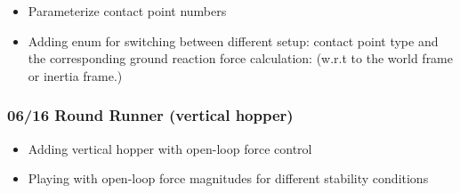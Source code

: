 \begin{itemize}
\item Parameterize contact point numbers
\item Adding enum for switching between different setup: contact point type and the corresponding ground reaction force calculation: (w.r.t to the world frame or inertia frame.)
\end{itemize}
\subsubsection*{06/16 Round Runner (vertical hopper)}

\begin{itemize}
\item Adding vertical hopper with open-loop force control
\item Playing with open-loop force magnitudes for different stability conditions
\end{itemize}
\pagebreak